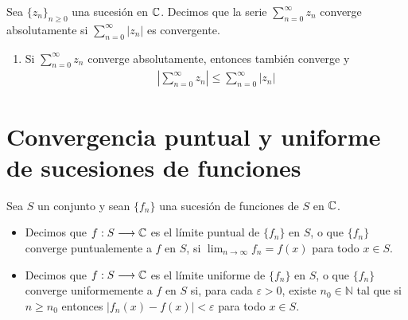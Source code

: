 \begin{defi}
    Sea $\{z_n\}_{n \ge 0}$ una sucesión en $\mathbb{C}$. Decimos que la serie $\sum_{n=0}^{\infty}{z_n}$ converge absolutamente si $\sum_{n=0}^{\infty}{|z_n|}$ es convergente.
\end{defi}

\begin{obs}
    \begin{enumerate}
        \item Si $\sum_{n=0}^{\infty}{z_n}$ converge absolutamente, entonces también converge y
              \begin{align*}
                  \left| \sum_{n=0}^{\infty}{z_n} \right| \leq \sum_{n=0}^{\infty}{|z_n|}
              \end{align*}
    \end{enumerate}
\end{obs}

\section{Convergencia puntual y uniforme de sucesiones de funciones}

\begin{defi}
    Sea $S$ un conjunto y sean $\{f_n\}$ una sucesión de funciones de $S$ en $\mathbb{C}$.
    \begin{itemize}
        \item Decimos que $f: S \longrightarrow \mathbb{C}$ es el límite puntual de $\{f_n\}$ en $S$, o que $\{f_n\}$ converge puntualemente a $f$ en $S$, si $\lim_{n \to \infty}{f_n} = f(x)$ para todo $x \in S$.
        \item Decimos que $f: S \longrightarrow \mathbb{C}$ es el límite uniforme de $\{f_n\}$ en $S$, o que $\{f_n\}$ converge uniformemente a $f$ en $S$ si, para cada $\varepsilon > 0$, existe $n_0 \in \mathbb{N}$ tal que si $n \ge n_0$ entonces $|f_n(x) - f(x)| < \varepsilon$ para todo $x \in S$.
    \end{itemize}
\end{defi}

